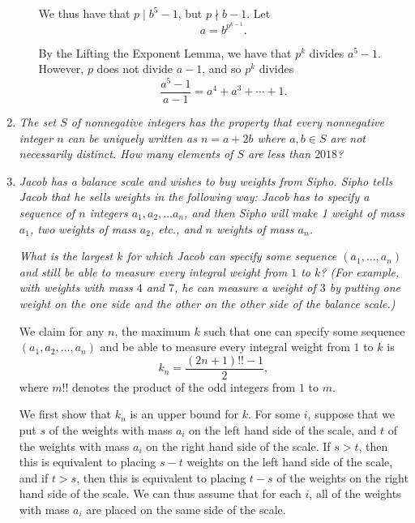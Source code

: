 \documentclass{article}
\begin{document}
\begin{enumerate}[1.]
\begin{enumerate}
We thus have that $p \mid b^5 - 1$, but $p \nmid b - 1$. Let
\[
	a = b^{p^{k - 1}}.
\]

By the Lifting the Exponent Lemma, we have that $p^k$ divides $a^5 - 1$. However, $p$ does not divide $a - 1$, and so $p^k$ divides
\[
	\frac{a^5 - 1}{a - 1} = a^4 + a^3 + \cdots + 1.
\]

\end{enumerate}


\vspace{6pt}
\item %
\textit{The set $S$ of nonnegative integers has the property that every nonnegative integer $n$ can be uniquely written as $n = a+2b$ where $a,b \in S$ are not necessarily distinct. How many elements of $S$ are less than $2018$?
}


\vspace{6pt}
\item %
\textit{Jacob has a balance scale and wishes to buy weights from Sipho. Sipho tells Jacob that he sells weights in the following way: Jacob has to specify a sequence of $n$ integers $a_1, a_2, \dotsc a_n$, and then Sipho will make 1 weight of mass $a_1$, two weights of mass $a_2$, etc., and $n$ weights of mass $a_n$.}

\textit{What is the largest $k$ for which Jacob can specify some sequence $(a_1, \dotsc, a_n)$ and still be able to measure every integral weight from $1$ to $k$? (For example, with weights with mass $4$ and $7$, he can measure a weight of $3$ by putting one weight on the one side and the other on the other side of the balance scale.)}


We claim for any $n$, the maximum $k$ such that one can specify some sequence $(a_1, a_2, \dots, a_n)$ and be able to measure every integral weight from $1$ to $k$ is
\[
  k_n = \frac{(2n + 1)!! - 1}{2},
\]
where $m!!$ denotes the product of the odd integers from $1$ to $m$.

We first show that $k_n$ is an upper bound for $k$. For some $i$, suppose that we put $s$ of the weights with mass $a_i$ on the left hand side of the scale, and $t$ of the weights with mass $a_i$ on the right hand side of the scale. If $s > t$, then this is equivalent to placing $s - t$ weights on the left hand side of the scale, and if $t > s$, then this is equivalent to placing $t - s$ of the weights on the right hand side of the scale. We can thus assume that for each $i$, all of the weights with mass $a_i$ are placed on the same side of the scale.


\end{enumerate}
\end{document}

